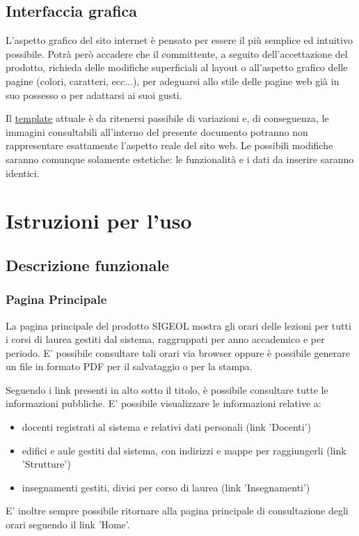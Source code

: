 \documentclass[11pt,a4paper]{article}
\begin{document}
\subsection{Interfaccia grafica}
L'aspetto grafico del sito internet è pensato per essere il più semplice ed intuitivo possibile. Potrà però accadere che il committente, a seguito dell'accettazione del prodotto, richieda delle modifiche superficiali al layout o all'aspetto grafico delle pagine (colori, caratteri, ecc...), per adeguarsi allo stile delle pagine web già in suo possesso o per adattarsi ai suoi gusti.

Il \underline{template} attuale è da ritenersi passibile di variazioni e, di conseguenza, le immagini consultabili all'interno del presente documento potranno non rappresentare esattamente l'aspetto reale del sito web. Le possibili modifiche saranno comunque solamente estetiche: le funzionalità e i dati da inserire saranno identici.
\section{Istruzioni per l'uso}
\subsection{Descrizione funzionale}
\subsubsection{Pagina Principale}
La pagina principale del prodotto SIGEOL mostra gli orari delle lezioni per tutti i corsi di laurea gestiti dal sistema, raggruppati per anno accademico e per periodo. E' possibile consultare tali orari via browser oppure è possibile generare un file in formato PDF per il salvataggio o per la stampa.

Seguendo i link presenti in alto sotto il titolo, è possibile consultare tutte le informazioni pubbliche. E' possibile visualizzare le informazioni relative a:
\begin{itemize}
 \item docenti registrati al sistema e relativi dati personali (link 'Docenti')
 \item edifici e aule gestiti dal sistema, con indirizzi e mappe per raggiungerli (link 'Strutture')
 \item insegnamenti gestiti, divisi per corso di laurea (link 'Insegnamenti')
\end{itemize}

E' inoltre sempre possibile ritornare alla pagina principale di consultazione degli orari seguendo il link 'Home'.
\end{document}
